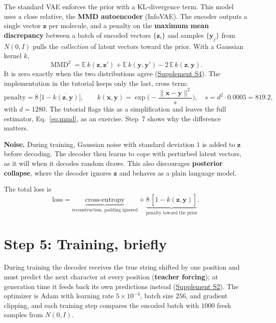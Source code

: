 \documentclass[11pt]{article}
\newcommand{\E}{\mathbb{E}}
\DeclareMathOperator{\MMD}{MMD}
\begin{document}
The standard VAE enforces the prior with a KL-divergence term. This model uses a close relative, the \textbf{MMD autoencoder} (InfoVAE). The encoder outputs a single vector $\bm z$ per molecule, and a penalty on the \textbf{maximum mean discrepancy} between a batch of encoded vectors $\{\bm z_i\}$ and samples $\{\bm y_j\}$ from $N(0,I)$ pulls the \emph{collection} of latent vectors toward the prior. With a Gaussian kernel $k$,
\begin{equation}
  \MMD^2=\E\,k(\bm z,\bm z')+\E\,k(\bm y,\bm y')-2\,\E\,k(\bm z,\bm y).
  \label{eq:mmd}
\end{equation}
It is zero exactly when the two distributions agree (\hyperref[sec:S4]{Supplement S4}). The implementation in the tutorial keeps only the last, cross term:
\begin{equation}
  \text{penalty}=8\,\big[1-\overline{k(\bm z,\bm y)}\big],\qquad
  k(\bm x,\bm y)=\exp\!\Big(-\frac{\lVert\bm x-\bm y\rVert^2}{s}\Big),\quad s=d^2\cdot0.0005=819.2,
  \label{eq:simple}
\end{equation}
with $d=1280$. The tutorial flags this as a simplification and leaves the full estimator, Eq.~\eqref{eq:mmd}, as an exercise. Step~7 shows why the difference matters.

\textbf{Noise.} During training, Gaussian noise with standard deviation $1$ is added to $\bm z$ before decoding. The decoder then learns to cope with perturbed latent vectors, as it will when it decodes random draws. This also discourages \textbf{posterior collapse}, where the decoder ignores $\bm z$ and behaves as a plain language model.

The total loss is
\[
  \text{loss}=\underbrace{\text{cross-entropy}}_{\text{reconstruction, padding ignored}}+\underbrace{8\,[1-\overline{k(\bm z,\bm y)}]}_{\text{penalty toward the prior}} .
\]

\section{Step 5: Training, briefly}
During training the decoder receives the true string shifted by one position and must predict the next character at every position (\textbf{teacher forcing}); at generation time it feeds back its own predictions instead (\hyperref[sec:S2]{Supplement S2}). The optimizer is Adam with learning rate $5\times10^{-4}$, batch size $256$, and gradient clipping, and each training step compares the encoded batch with $1000$ fresh samples from $N(0,I)$.
\end{document}
